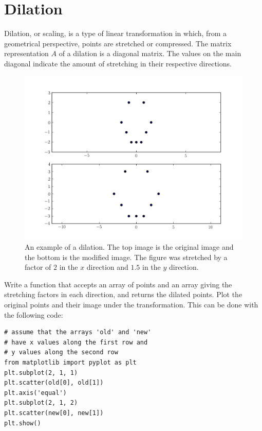 \section*{Dilation}
Dilation, or scaling, is a type of linear transformation in which, from a
geometrical perspective, points are stretched or compressed.
The matrix representation $A$ of a dilation is a diagonal matrix. The values
on the main diagonal indicate the amount of stretching in their respective
directions.
\begin{figure}
\centering
\includegraphics[width=\textwidth]{stretch.pdf}
\caption{
An example of a dilation. The top image is the original image and the bottom is
the modified image.
The figure was stretched by a factor of $2$ in the $x$ direction and $1.5$ in
the $y$ direction.}
\end{figure}

\begin{problem}
Write a function that accepts an array of points and an array giving the
stretching factors in each direction, and returns the dilated points.
Plot the original points and their image under the transformation.
This can be done with the following code:
\begin{lstlisting}
# assume that the arrays 'old' and 'new'
# have x values along the first row and
# y values along the second row
from matplotlib import pyplot as plt
plt.subplot(2, 1, 1)
plt.scatter(old[0], old[1])
plt.axis('equal')
plt.subplot(2, 1, 2)
plt.scatter(new[0], new[1])
plt.show()
\end{lstlisting}
\end{problem}

